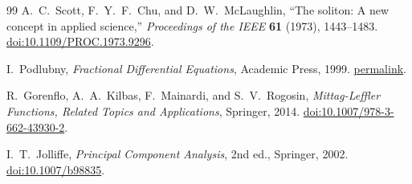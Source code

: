 \documentclass[11pt]{article}
\begin{document}
\begin{thebibliography}{99}
A.~C.~Scott, F.~Y.~F.~Chu, and D.~W.~McLaughlin,
``The soliton: A new concept in applied science,''
\emph{Proceedings of the IEEE} \textbf{61} (1973), 1443--1483.
\href{https://doi.org/10.1109/PROC.1973.9296}{doi:10.1109/PROC.1973.9296}.

I.~Podlubny,
\emph{Fractional Differential Equations},
Academic Press, 1999.
\href{https://www.sciencedirect.com/bookseries/mathematics-in-science-and-engineering/vol/198/suppl/C}{permalink}.

R.~Gorenflo, A.~A.~Kilbas, F.~Mainardi, and S.~V.~Rogosin,
\emph{Mittag-Leffler Functions, Related Topics and Applications}, Springer, 2014.
\href{https://doi.org/10.1007/978-3-662-43930-2}{doi:10.1007/978-3-662-43930-2}.

I.~T.~Jolliffe,
\emph{Principal Component Analysis}, 2nd ed., Springer, 2002.
\href{https://doi.org/10.1007/b98835}{doi:10.1007/b98835}.
\end{thebibliography}
\end{document}

